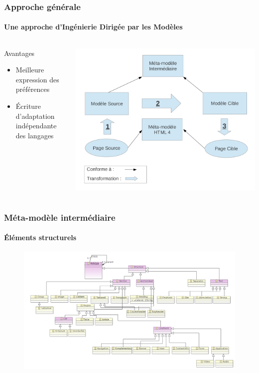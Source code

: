 \documentclass[9pt]{beamer}
\begin{document}
\begin{frame}
	\frametitle{Approche générale}
	\framesubtitle{Une approche d'Ingénierie Dirigée par les Modèles}
	\begin{columns}
		\begin{column}{4cm}
			\begin{block}{Avantages}
				\begin{itemize}
					\item Meilleure expression des préférences
					\item Écriture d'adaptation indépendante des langages
				\end{itemize}
			\end{block}
		\end{column}
		\begin{column}{6cm}
		\includegraphics[scale=0.3]{img/workflow-adaptation.jpg}
		\end{column}		
	\end{columns}
\end{frame}






\begin{frame}
\frametitle{Méta-modèle intermédiaire}
\framesubtitle{Éléments structurels}
\begin{figure}
\centering
\includegraphics[scale=0.335]{img/metamodele_structure.png}
\end{figure}
\end{frame}
\end{document}
